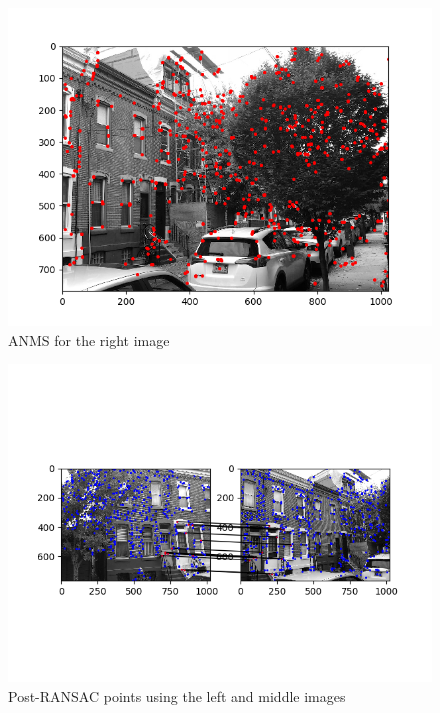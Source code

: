 \documentclass[10pt]{article}
\begin{document}
			\begin{figure}[h]
			\caption{ANMS for the right image}
			\centering
			\includegraphics{img/bricksANMSright.png}
		\end{figure}
			
		\begin{figure}[h]
			\caption{Post-RANSAC points using the left and middle images}
			\centering
			\includegraphics{img/bricksRANSACl2m.png}
		\end{figure}
		
\end{document}
